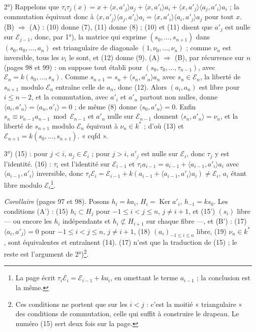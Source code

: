 \documentclass[11pt,a4paper]{article}
\begin{document}
2°) Rappelons que $\tau_i\tau_j(x) = x + \langle x, a'_j \rangle a_j + \langle x,
a'_i \rangle a_i + \langle x, a'_j \rangle\langle a_j, a'_i \rangle a_i$ ; la
commutation équivaut donc à $\langle x, a'_j \rangle\langle a_j, a'_i \rangle
a_i = \langle x, a'_i \rangle\langle a_i, a'_j \rangle a_j$ pour tout $x$.
(B) $\Rightarrow$ (A) : (10) donne (7), (11) donne (8) ; (10) et (11) disent que
$a'_j$ est nulle sur $\mathcal{E}_{j-1}$, donc, par 1°), la matrice qui exprime
$(s_0, \ldots, s_{n+1})$ dans $(s_0, a_0, \ldots, a_n)$ est triangulaire de
diagonale $(1, \nu_0, \ldots, \nu_n)$ ; comme $\nu_n$ est inversible, tous les
$\nu_i$ le sont, et (12) donne (9). (A) $\Rightarrow$ (B), par récurrence sur
$n$ (pages 98 et 99) : on suppose tout établi pour $(s_0, \tau_0, \ldots,
\tau_{n-1})$, avec $\mathcal{E}_n = k(s_0, \ldots, s_n)$. Comme $s_{n+1} = s_n +
\langle s_n, a'_n \rangle a_n$ avec $s_n \in \mathcal{E}_n$, la liberté de
$s_{n+1}$ modulo $\mathcal{E}_n$ entraîne celle de $a_n$, donc (12). Alors $(a_i,
a_n)$ est libre pour $i \leqslant n-2$, et la commutation, avec $a'_i$ et $a'_n$
partout non nulles, donne $\langle a_i, a'_n \rangle = \langle a_n, a'_i \rangle
= 0$ ; de même (8) donne $\langle s_0, a'_n \rangle = 0$. Enfin $s_n \equiv
\nu_{n-1}a_{n-1} \bmod \mathcal{E}_{n-1}$ et $a'_n$ nulle sur $\mathcal{E}_{n-1}$
donnent $\langle s_n, a'_n \rangle = \nu_n$, et la liberté de $s_{n+1}$ modulo
$\mathcal{E}_n$ équivaut à $\nu_n \in k^*$ ; d'où (13) et $\mathcal{E}_{n+1} =
k(s_0, \ldots, s_{n+1})$. « cqfd ».

3°) (15) : pour $j < i$, $a_j \in \mathcal{E}_i$ ; pour $j > i$, $a'_j$ est
nulle sur $\mathcal{E}_i$, donc $\tau_j$ y est l'identité. (16) : $\tau_i$ est
l'identité sur $\mathcal{E}_{i-1}$ et $\tau_i a_{i-1} = a_{i-1} + \langle a_{i-1},
a'_i \rangle a_i$ avec $\langle a_{i-1}, a'_i \rangle$ inversible, donc $\tau_i
\mathcal{E}_i = \mathcal{E}_{i-1} + k(a_{i-1} + \langle a_{i-1}, a'_i \rangle
a_i) \neq \mathcal{E}_i$, $a_i$ étant libre modulo $\mathcal{E}_i$\footnote{La
page écrit $\tau_i\mathcal{E}_i = \mathcal{E}_{i-1} + ka_i$, en omettant le terme
$a_{i-1}$ ; la conclusion est la même.}.

\emph{Corollaire} (pages 97 et 98). Posons $h_i = ka_i$, $H_i = \operatorname{Ker}
a'_i$, $h_{-1} = ks_0$. Les conditions (A') : (15) $h_i \subset H_j$ pour $-1
\leqslant i < j \leqslant n$, $j \neq i+1$, et (15') $(s_i)$ libre --- ou encore
les $h_i$ indépendants et $h_i \not\subset H_{i+1}$ sur chaque fibre ---, et
(B') : (17) $\langle a_i, a'_j \rangle = 0$ pour $-1 \leqslant i < j \leqslant
n$, $j \neq i+1$, (18) $(a_i)_{-1 \leqslant i \leqslant n}$ libre, (19) $\nu_n
\in k^*$, sont équivalentes et entraînent (14). (17) n'est que la traduction de
(15) ; le reste est l'argument de 2°)\footnote{Ces conditions ne portent que sur
les $i < j$ : c'est la moitié « triangulaire » des conditions de commutation,
celle qui suffit à construire le drapeau. Le numéro (15) sert deux fois sur la
page.}.
\end{document}
